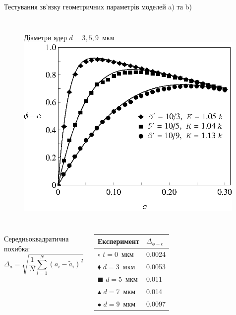\documentclass[10pt]{beamer}
\begin{document}
\begin{frame}{Тестування зв'язку геометричних параметрів моделей a) та b)}
\begin{columns}[T,onlytextwidth]
      \begin{figure}
        \centering
        \qquad Діаметри ядер $d=3,5,9$~мкм
        \includegraphics[width=0.99\textwidth]{images/Fig3_SiekierskiShell_103-9.eps}
      \end{figure}
\end{columns}

\begin{columns}[T,onlytextwidth]
      \vspace{10pt}
      Середньоквадратична похибка:
      $$
        \Delta_a = \sqrt{\frac{1}{N}\sum\limits_{i=1}^N (a_i - \tilde{a}_i)^2}
      $$

      \begin{table}
        \begin{tabular}{ll}
          \toprule
          Експеримент & $\Delta_{\phi-c}$\\
          \midrule
          $\circ$ $t=0$~мкм & 0.0024\\
          $\blacklozenge$ $d=3$~мкм & 0.0053\\
          $\blacksquare$ $d=5$~мкм & 0.011\\
          $\blacktriangle$ $d=7$~мкм & 0.014\\
          $\bullet$ $d=9$~мкм & 0.0097\\
          \bottomrule
        \end{tabular}
      \end{table}
\end{columns}

\end{frame}
\end{document}
